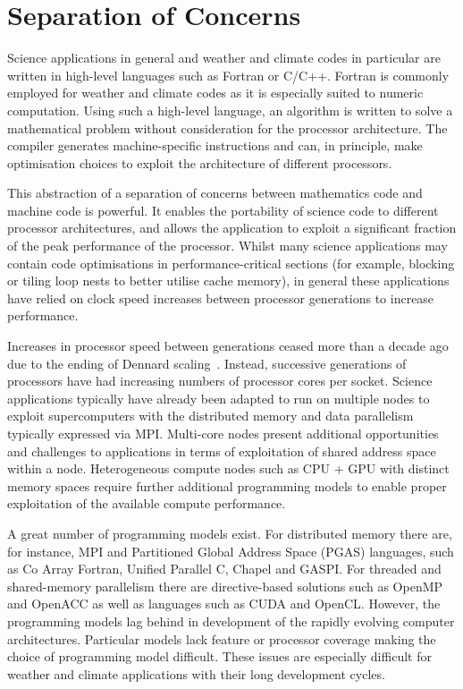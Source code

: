 \documentclass[review,times]{elsarticle}
\begin{document}
\section{\label{sec:SoC}Separation of Concerns}

Science applications in general and weather and climate codes in
particular are written in high-level languages such as Fortran or
C/C++. Fortran is commonly employed for weather and climate
codes as it is especially suited to numeric computation. Using
such a high-level language, an algorithm is written to solve a
mathematical problem without consideration for the processor
architecture. The compiler generates machine-specific instructions
and can, in principle, make optimisation choices to exploit the
architecture of different processors.

This abstraction of a separation of concerns between mathematics code
and machine code is powerful. It enables the portability of
science code to different processor architectures, and allows the
application to exploit a significant fraction of the peak
performance of the processor. Whilst many science applications may
contain code optimisations in performance-critical sections (for
example, blocking or tiling loop nests to better utilise cache memory),
in general these applications have relied on clock
speed increases between processor generations to increase performance.

Increases in processor speed between generations ceased more than a decade
ago due to the ending of Dennard scaling~\cite{dennard}. Instead,
successive generations of processors have had increasing numbers of processor cores per
socket. Science applications typically have already been adapted to run on multiple
nodes to exploit supercomputers with the distributed memory and data parallelism
typically expressed via MPI. Multi-core nodes present
additional opportunities and challenges to applications in terms of exploitation of
shared address space within a node. Heterogeneous compute nodes such as
CPU + GPU with distinct memory spaces require further additional programming
models to enable proper exploitation of the available compute performance.

A great number of programming models exist. For distributed memory there are, 
for instance, MPI and Partitioned Global Address Space (PGAS) languages, such 
as Co Array Fortran, Unified Parallel C, Chapel and GASPI. For threaded and 
shared-memory parallelism there are directive-based solutions such as OpenMP 
and OpenACC as well as languages such as CUDA and OpenCL. However,
the programming models lag behind in development of the rapidly evolving computer
architectures. Particular models lack feature or processor coverage
making the choice of programming model difficult. These issues are
especially difficult for weather and climate applications with their long development
cycles. 
\end{document}
